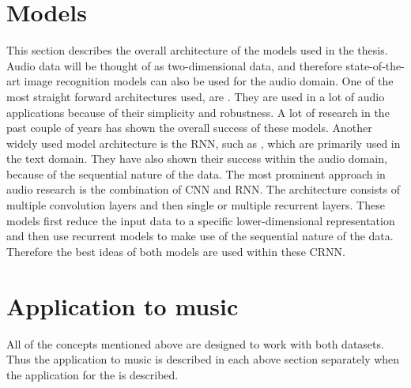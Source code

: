 \section{Models}
\label{sec:Models}
This section describes the overall architecture of the models used in the thesis. Audio data will be thought of as two-dimensional data, and therefore state-of-the-art image recognition models can also be used for the audio domain.
\newline
\newline
One of the most straight forward architectures used, are . They are used in a lot of audio applications because of their simplicity and robustness. A lot of research in the past couple of years has shown the overall success of these models.
\newline
\newline
Another widely used model architecture is the \gls{RNN}, such as , which are primarily used in the text domain. They have also shown their success within the audio domain, because of the sequential nature of the data.
\newline
\newline
The most prominent approach in audio research is the combination of \gls{CNN} and \gls{RNN}. The architecture consists of multiple convolution layers and then single or multiple recurrent layers. These models first reduce the input data to a specific lower-dimensional representation and then use recurrent models to make use of the sequential nature of the data. Therefore the best ideas of both models are used within these \gls{CRNN}.

\section{Application to music}
\label{sec:Application-Music}
All of the concepts mentioned above are designed to work with both datasets. Thus the application to music is described in each above section separately when the application for the  is described.
